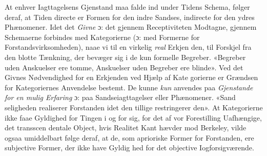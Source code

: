 \documentclass[12pt,a4paper]{book}
\begin{document}
At enhver Iagttagelsens Gjenstand maa falde ind under
Tidens Schema, følger deraf, at Tiden directe er Formen for
den indre Sandses, indirecte for den ydres Phænomener. Idet
det \emph{Givne} ɔ: det gjennem Receptiviteten Modtagne, gjennem
Schemaerne forbindes med Kategorierne (ɔ: med Formerne for
Forstandsvirksomheden), naae vi til en virkelig \emph{real} Erkjen\-%
den, til Forskjel fra den blotte Tænkning, der bevæger sig i
de kun formelle Begreber. «Begreber uden Anskuelser ere
tomme, Anskuelser uden Begreber ere blinde». Ved det
Givnes Nødvendighed for en Erkjenden ved Hjælp af Kate\-%
gorierne er Grændsen for Kategoriernes Anvendelse bestemt.
De kunne \emph{kun} anvendes paa \emph{Gjenstande for en mulig
Erfaring} ɔ: paa Sandseiagttagelser eller Phænomener. «Sand\-%
seligheden realiserer Forstanden idet den tillige restringerer
den». At Kategorierne ikke faae Gyldighed for Tingen i og
for sig, for det af vor Forestilling Uafhængige, det transscen\-%
dentale Object, hvis Realitet Kant hævder mod Berkeley, vilde
ogsaa umiddelbart følge deraf, at de, som aprioriske Former
for Forstanden, ere subjective Former, der ikke have Gyldig\-%
hed for det objective Iogforsigværende.
\end{document}
